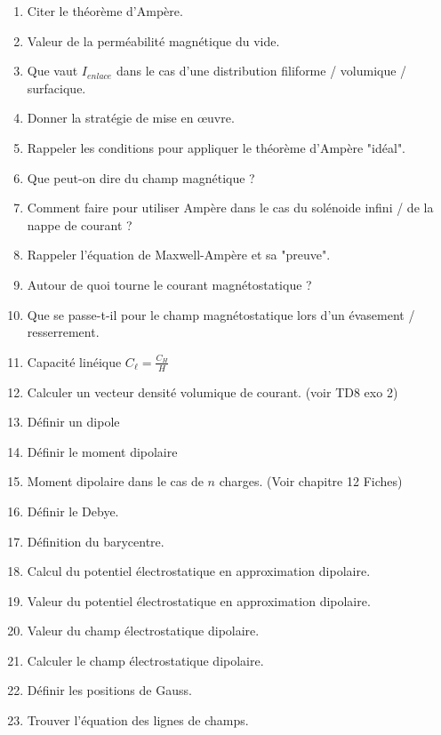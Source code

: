 \documentclass[a4paper, 11pt, hidelinks]{article}
\begin{document}
\begin{enumerate}
    \item Citer le théorème d'Ampère. \cite{Chapitre11}
    \item Valeur de la perméabilité magnétique du vide. \cite{Chapitre11}
    \item Que vaut $I_{enlace}$ dans le cas d'une distribution filiforme / volumique / surfacique. \cite{Chapitre11}
    \item Donner la stratégie de mise en \oe uvre. \cite{Chapitre11}
    \item Rappeler les conditions pour appliquer le théorème d'Ampère "idéal". \cite{Chapitre11}
    \item Que peut-on dire du champ magnétique ? \cite{Chapitre11}
    \item Comment faire pour utiliser Ampère dans le cas du solénoide infini / de la nappe de courant ? \cite{Chapitre11}
    \item Rappeler l'équation de Maxwell-Ampère et sa "preuve". \cite{Chapitre11}
    \item Autour de quoi tourne le courant magnétostatique ? \cite{Chapitre11}
    \item Que se passe-t-il pour le champ magnétostatique lors d'un évasement / resserrement. \cite{Chapitre11}
    \item Capacité linéique $C_{\ell}=\frac{C_H}{H}$
    \item Calculer un vecteur densité volumique de courant. (voir TD8 exo 2)
    \item Définir un dipole \cite{Chapitre12}
    \item Définir le moment dipolaire \cite{Chapitre12}
    \item Moment dipolaire dans le cas de $n$ charges. (Voir chapitre 12 Fiches)
    \item Définir le Debye. \cite{Chapitre12}
    \item Définition du barycentre. \cite{Chapitre12}
    \item Calcul du potentiel électrostatique en approximation dipolaire. \cite{Chapitre12}
    \item Valeur du potentiel électrostatique en approximation dipolaire. \cite{Chapitre12}
    \item Valeur du champ électrostatique dipolaire. \cite{Chapitre12}
    \item Calculer le champ électrostatique dipolaire. \cite{Chapitre12}
    \item Définir les positions de Gauss. \cite{Chapitre12}
    \item Trouver l'équation des lignes de champs. \cite{Chapitre12}

\end{enumerate}
\end{document}
